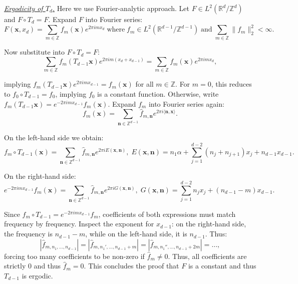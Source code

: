 \documentclass{template}
\begin{document}
\underline{\textit{Ergodicity of $T_d$.}} Here we use Fourier-analytic approach.
Let $F \in L^2(\mathbb{R}^d/\mathbb{Z}^d)$ and $F \circ T_d = F$. Expand $F$ into Fourier series:
\begin{equation*}
    F(\mathbf{x}, x_d) = \sum_{m \in \mathbb{Z}} f_m(\mathbf{x})e^{2\pi i m x_d} \; \text{where} \; f_m \in L^2(\mathbb{R}^{d-1}/\mathbb{Z}^{d-1}) \; \text{and} \; \sum_{m \in \mathbb{Z}} \|f_m\|_2^2 < \infty.
\end{equation*}

Now substitute into $F \circ T_d = F$:
\begin{equation*}
    \sum_{m \in \mathbb{Z}} f_m(T_{d-1}\mathbf{x})e^{2\pi i m (x_d+x_{d-1})} = \sum_{m \in \mathbb{Z}} f_m(\mathbf{x})e^{2\pi i m x_d},
\end{equation*}

implying $f_m(T_{d-1}\mathbf{x})e^{2\pi imx_{d-1}} = f_m(\mathbf{x})$ for all $m \in \mathbb{Z}$.
For $m=0$, this reduces to $f_0 \circ T_{d-1}=f_0$, implying $f_0$ is a constant function.
Otherwise, write $f_m(T_{d-1}\mathbf{x}) = e^{-2\pi imx_{d-1}}f_m(\mathbf{x})$. Expand $f_m$
into Fourier series again:
\begin{equation*}
    f_m(\mathbf{x}) = \sum_{\mathbf{n} \in \mathbb{Z}^{d-1}} \widehat{f}_{m,\mathbf{n}}e^{2\pi i\langle \mathbf{n}, \mathbf{x} \rangle}.
\end{equation*}

On the left-hand side we obtain:
\begin{equation*}
    f_m \circ T_{d-1}(\mathbf{x}) = \sum_{\mathbf{n} \in \mathbb{Z}^{d-1}} \widehat{f}_{m,\mathbf{n}}e^{2\pi i E(\mathbf{x},\mathbf{n})}, \; E(\mathbf{x},\mathbf{n}) = n_1\alpha + \sum_{j=1}^{d-2}(n_j+n_{j+1})x_j + n_{d-1}x_{d-1}.
\end{equation*}

On the right-hand side:
\begin{equation*}
    e^{-2\pi imx_{d-1}}f_m(\mathbf{x}) = \sum_{\mathbf{n} \in \mathbb{Z}^{d-1}} \widehat{f}_{m,\mathbf{n}}e^{2\pi i G(\mathbf{x},\mathbf{n})}, \; G(\mathbf{x}, \mathbf{n}) = \sum_{j=1}^{d-2}n_jx_j + (n_{d-1}-m)x_{d-1}.
\end{equation*}

Since $f_m \circ T_{d-1}=e^{-2\pi imx_{d-1}}f_m$, coefficients of both expressions
must match frequency by frequency. Inspect the exponent for $x_{d-1}$: on the right-hand side,
the frequency is $n_{d-1}-m$, while on the left-hand side, it is $n_{d-1}$. Thus:
\begin{equation*}
    |\widehat{f}_{m,n_1,\dots,n_{d-1}}| = |\widehat{f}_{m,n_1',\dots,n_{d-1}+m}| = |\widehat{f}_{m,n_1'',\dots,n_{d-1}+2m}| = \dots,
\end{equation*}
forcing too many coefficients to be non-zero if $\widehat{f}_{m} \neq 0$.
Thus, all coefficients are strictly $0$ and thus $\widehat{f}_m = 0$.
This concludes the proof that $F$ is a constant and thus $T_{d-1}$ is ergodic.
\end{document}
